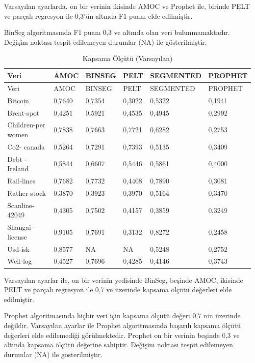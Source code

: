 \documentclass[12pt,twoside]{deuthesis}
\begin{document}
Varsayılan ayarlarda, on bir verinin ikisinde AMOC ve Prophet ile, birinde PELT ve parçalı regresyon ile 0,3'ün altında F1 puanı elde edilmiştir.

BinSeg algoritmasında F1 puanı 0,3 ve altında olan veri bulunmamaktadır. Değişim noktası tespit edilemeyen durumlar (NA) ile gösterilmiştir.

\begin{longtable}[]{@{}llllll@{}}
\caption{\label{tab:nvar3} Kapsama Ölçütü (Varsayılan)}\tabularnewline
\toprule\noalign{}
Veri & AMOC & BINSEG & PELT & SEGMENTED & PROPHET \\
\midrule\noalign{}
\endfirsthead
\toprule\noalign{}
Veri & AMOC & BINSEG & PELT & SEGMENTED & PROPHET \\
\midrule\noalign{}
\endhead
\bottomrule\noalign{}
\endlastfoot
Bitcoin & 0,7640 & 0,7354 & 0,3022 & 0,5322 & 0,1941 \\
Brent-spot & 0,4251 & 0,5921 & 0,4535 & 0,4945 & 0,2992 \\
Children-per women & 0,7838 & 0,7663 & 0,7721 & 0,6282 & 0,2753 \\
Co2- canada & 0,5264 & 0,7291 & 0,7393 & 0,5135 & 0,3409 \\
Debt -Ireland & 0,5844 & 0,6607 & 0,5446 & 0,5861 & 0,4000 \\
Rail-lines & 0,7682 & 0,7732 & 0,4408 & 0,7890 & 0,3081 \\
Rather-stock & 0,3870 & 0,3923 & 0,3970 & 0,5164 & 0,3470 \\
Scanline-42049 & 0,4305 & 0,7502 & 0,4157 & 0,3859 & 0,3249 \\
Shangai-license & 0,9105 & 0,7691 & 0,3132 & 0,8272 & 0,2458 \\
Usd-isk & 0,8577 & NA & NA & 0,5248 & 0,2752 \\
Well-log & 0,4527 & 0,7696 & 0,4285 & 0,4146 & 0,3743 \\
\end{longtable}

Varsayılan ayarlar ile, on bir verinin yedisinde BinSeg, beşinde AMOC, ikisinde PELT ve parçalı regresyon ile 0,7 ve üzerinde kapsama ölçütü değerleri elde edilmiştir.

Prophet algoritmasında hiçbir veri için kapsama ölçütü değeri 0,7 nin üzerinde değildir. Varsayılan ayarlar ile Prophet algoritmasında başarılı kapsama ölçütü değerleri elde edilemediği görülmektedir. Prophet on bir verinin beşinde 0,3 ve altında kapsama ölçütü değerine sahiptir. Değişim noktası tespit edilemeyen durumlar (NA) ile gösterilmiştir.
\end{document}

